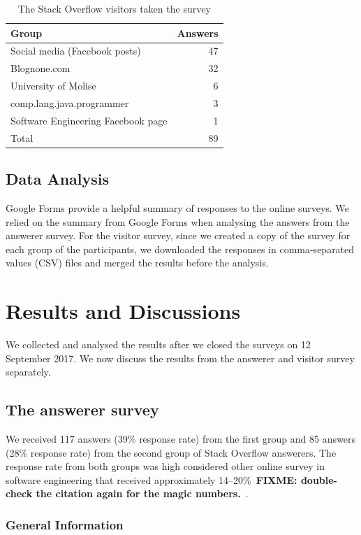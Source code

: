 \documentclass{svjour3}                     %
\newcommand\FIXME[1]{\textbf{FIXME: #1}}
\begin{document}
\begin{table}
	\centering
	\caption{The Stack Overflow visitors taken the survey}
	\label{tab:visitors}
	\begin{tabular}{lr}
		\toprule
		Group & Answers \\
		\midrule
		Social media (Facebook posts) & 47 \\
		Blognone.com & 32 \\
		University of Molise & 6 \\
		comp.lang.java.programmer & 3 \\
		Software Engineering Facebook page & 1 \\
		\midrule
		Total & 89 \\
		\bottomrule
	\end{tabular}
\end{table}

\subsection{Data Analysis}
Google Forms provide a helpful summary of responses to the online surveys. We
relied on the summary from Google Forms when analysing the answers from the
answerer survey. For the visitor survey, since we created a copy of the survey for each
group of the participants, we downloaded the responses in comma-separated values
(CSV) files and merged the results before the analysis.

\section{Results and Discussions}
We collected and analysed the results after we closed the surveys on 12
September 2017. We now discuss the results from the answerer and
visitor survey separately.

\subsection{The answerer survey}
We received 117 answers (39\% response rate) from the first group and 85 answers
(28\% response rate) from the second group of Stack Overflow answerers. The response
rate from both groups was high considered other online survey in software
engineering that received approximately 14--20\%~\FIXME{double-check the
	citation again for the magic numbers.}~\citep{Punter2003}.

\subsubsection{General Information}
\end{document}
